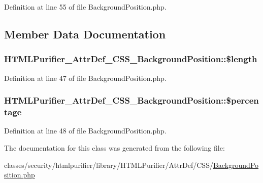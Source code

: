 Definition at line 55 of file Background\+Position.\+php.



\subsection{Member Data Documentation}
\hypertarget{classHTMLPurifier__AttrDef__CSS__BackgroundPosition_ad61228f5654ccd804ec390999c5b6bf5}{
\subsubsection[{\$length}]{\setlength{\rightskip}{0pt plus 5cm}H\+T\+M\+L\+Purifier\+\_\+\+Attr\+Def\+\_\+\+C\+S\+S\+\_\+\+Background\+Position\+::\$length\hspace{0.3cm}{\ttfamily [protected]}}}\label{classHTMLPurifier__AttrDef__CSS__BackgroundPosition_ad61228f5654ccd804ec390999c5b6bf5}


Definition at line 47 of file Background\+Position.\+php.

\hypertarget{classHTMLPurifier__AttrDef__CSS__BackgroundPosition_af726a396376661d1b536ef8cf3c17150}{
\subsubsection[{\$percentage}]{\setlength{\rightskip}{0pt plus 5cm}H\+T\+M\+L\+Purifier\+\_\+\+Attr\+Def\+\_\+\+C\+S\+S\+\_\+\+Background\+Position\+::\$percentage\hspace{0.3cm}{\ttfamily [protected]}}}\label{classHTMLPurifier__AttrDef__CSS__BackgroundPosition_af726a396376661d1b536ef8cf3c17150}


Definition at line 48 of file Background\+Position.\+php.



The documentation for this class was generated from the following file\+:\begin{DoxyCompactItemize}
\item 
classes/security/htmlpurifier/library/\+H\+T\+M\+L\+Purifier/\+Attr\+Def/\+C\+S\+S/\hyperlink{BackgroundPosition_8php}{Background\+Position.\+php}\end{DoxyCompactItemize}
